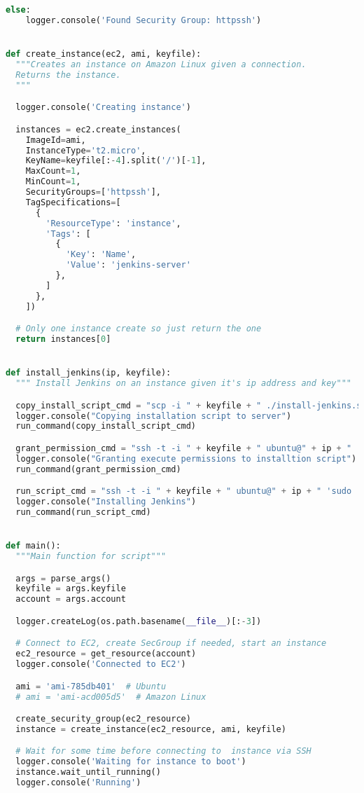 \begin{lstlisting}[language=python]
  else:
    logger.console('Found Security Group: httpssh')


def create_instance(ec2, ami, keyfile):
  """Creates an instance on Amazon Linux given a connection.
  Returns the instance.
  """

  logger.console('Creating instance')

  instances = ec2.create_instances(
    ImageId=ami,
    InstanceType='t2.micro',
    KeyName=keyfile[:-4].split('/')[-1],
    MaxCount=1,
    MinCount=1,
    SecurityGroups=['httpssh'],
    TagSpecifications=[
      {
        'ResourceType': 'instance',
        'Tags': [
          {
            'Key': 'Name',
            'Value': 'jenkins-server'
          },
        ]
      },
    ])

  # Only one instance create so just return the one
  return instances[0]


def install_jenkins(ip, keyfile):
  """ Install Jenkins on an instance given it's ip address and key"""

  copy_install_script_cmd = "scp -i " + keyfile + " ./install-jenkins.sh ubuntu@" + ip + ":."
  logger.console("Copying installation script to server")
  run_command(copy_install_script_cmd)

  grant_permission_cmd = "ssh -t -i " + keyfile + " ubuntu@" + ip + " 'chmod +x ./install-jenkins.sh'"
  logger.console("Granting execute permissions to installtion script")
  run_command(grant_permission_cmd)

  run_script_cmd = "ssh -t -i " + keyfile + " ubuntu@" + ip + " 'sudo ./install-jenkins.sh'"
  logger.console("Installing Jenkins")
  run_command(run_script_cmd)


def main():
  """Main function for script"""

  args = parse_args()
  keyfile = args.keyfile
  account = args.account

  logger.createLog(os.path.basename(__file__)[:-3])

  # Connect to EC2, create SecGroup if needed, start an instance
  ec2_resource = get_resource(account)
  logger.console('Connected to EC2')

  ami = 'ami-785db401'  # Ubuntu
  # ami = 'ami-acd005d5'  # Amazon Linux

  create_security_group(ec2_resource)
  instance = create_instance(ec2_resource, ami, keyfile)

  # Wait for some time before connecting to  instance via SSH
  logger.console('Waiting for instance to boot')
  instance.wait_until_running()
  logger.console('Running')


\end{lstlisting}
